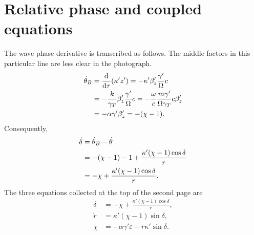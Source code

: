 \documentclass[11pt,a4paper]{article}
\newcommand{\dd}{\mathrm{d}}
\begin{document}
\newpage
\section{Relative phase and coupled equations}
The wave-phase derivative is transcribed as follows. The middle factors
in this particular line are less clear in the photograph.
\begin{align}
\dot\theta_B
&=\frac{\dd}{\dd\tau}(\kappa'z')
=-\kappa'\beta_z'\frac{\gamma'}{\Omega}c\notag\\
&=-\frac{k}{\gamma_T}\beta_z'\frac{\gamma'}{\Omega}c
=-\frac{\omega}{c}\frac{m\gamma'}{\Omega\gamma_T}c\beta_z'
\notag\\
&=-\alpha\gamma'\beta_z'=-(\chi-1).
\end{align}
Consequently,
\begin{align}
\dot\delta&=\dot\theta_B-\dot\theta\notag\\
&=-(\chi-1)-1+\frac{\kappa'(\chi-1)\cos\delta}{r}\notag\\
&=-\chi+\frac{\kappa'(\chi-1)\cos\delta}{r}.
\end{align}
The three equations collected at the top of the second page are
\begin{equation}
\boxed{\begin{aligned}
\dot\delta&=-\chi+\frac{\kappa'(\chi-1)\cos\delta}{r},\\
\dot r&=\kappa'(\chi-1)\sin\delta,\\
\dot\chi&=-\alpha\gamma'\varepsilon-r\kappa'\sin\delta.
\end{aligned}}
\label{eq:system}
\end{equation}
\end{document}
